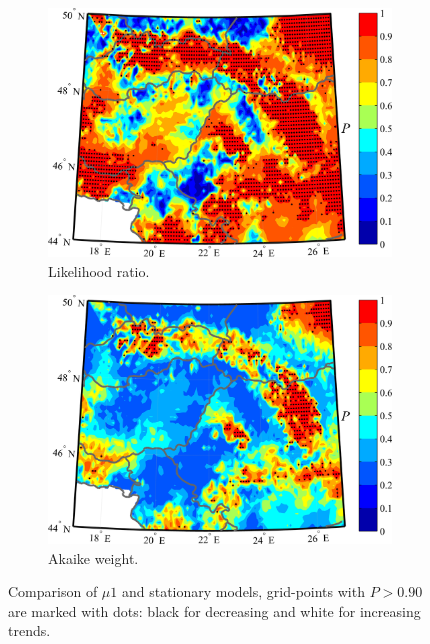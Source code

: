 \begin{figure}[htbp!]
	\begin{subfigure}[b]{0.49\textwidth}    
		\includegraphics[width=\textwidth]{LR_test_stat_m1_p0_90_crude.jpg}
		\caption{Likelihood ratio.}
		\label{fig:LR_mu1}
	\end{subfigure}
	\hfill
	\begin{subfigure}[b]{0.49\textwidth}
		\includegraphics[width=\textwidth]{A_weight_stat_m1_p0_90_crude.jpg}
		\caption{Akaike weight.}
		\label{fig:AW_mu1}
	\end{subfigure}
	\caption{Comparison of $\mu 1$ and stationary models, grid-points with $P > 0.90$ are marked with dots: black for decreasing and white for increasing trends.}
\end{figure}

